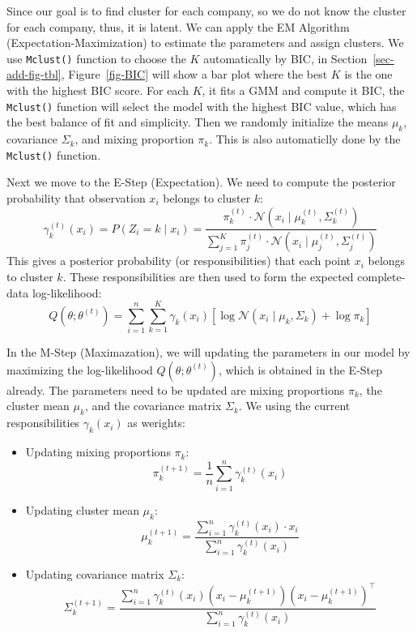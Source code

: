\documentclass[
  letterpaper,
  DIV=11,
  numbers=noendperiod]{scrartcl}
\providecommand{\tightlist}{%
  \setlength{\itemsep}{0pt}\setlength{\parskip}{0pt}}\usepackage{longtable,booktabs,array}
\begin{document}
Since our goal is to find cluster for each company, so we do not know
the cluster for each company, thus, it is latent. We can apply the EM
Algorithm (Expectation-Maximization) to estimate the parameters and
assign clusters. We use \texttt{Mclust()} function to choose the \(K\)
automatically by BIC, in Section~\ref{sec-add-fig-tbl},
Figure~\ref{fig-BIC} will show a bar plot where the best \(K\) is the
one with the highest BIC score. For each \(K\), it fits a GMM and
compute it BIC, the \texttt{Mclust()} function will select the model
with the highest BIC value, which has the best balance of fit and
simplicity. Then we randomly initialize the means \(\mu_k\), covariance
\(\Sigma_k\), and mixing proportion \(\pi_k\). This is also automaticlly
done by the \texttt{Mclust()} function.

Next we move to the E-Step (Expectation). We need to compute the
posterior probability that observation \(x_i\) belongs to cluster \(k\):
\[
\gamma_k^{(t)}(x_i) = P(Z_i = k \mid x_i) = 
\frac{ \pi_k^{(t)} \cdot \mathcal{N}(x_i \mid \mu_k^{(t)}, \Sigma_k^{(t)}) }
     { \sum_{j=1}^{K} \pi_j^{(t)} \cdot \mathcal{N}(x_i \mid \mu_j^{(t)}, \Sigma_j^{(t)}) }
\] This gives a posterior probability (or responsibilities) that each
point \(x_i\) belongs to cluster \(k\). These responsibilities are then
used to form the expected complete-data log-likelihood: \[
Q(\theta; \theta^{(t)}) = \sum_{i=1}^{n} \sum_{k=1}^{K} \gamma_k(x_i) \left[ \log \mathcal{N}(x_i \mid \mu_k, \Sigma_k) + \log \pi_k \right]
\]

In the M-Step (Maximazation), we will updating the parameters in our
model by maximizing the log-likelihood \(Q(\theta; \theta^{(t)})\),
which is obtained in the E-Step already. The parameters need to be
updated are mixing proportions \(\pi_k\), the cluster mean \(\mu_k\),
and the covariance matrix \(\Sigma_k\). We using the current
responsibilities \(\gamma_k(x_i)\) as werights:

\begin{itemize}
\tightlist
\item
  Updating mixing proportions \(\pi_k\): \[
  \pi_k^{(t+1)} = \frac{1}{n} \sum_{i=1}^{n} \gamma_k^{(t)}(x_i)
  \]
\item
  Updating cluster mean \(\mu_k\): \[
  \mu_k^{(t+1)} = \frac{\sum_{i=1}^{n} \gamma_k^{(t)}(x_i) \cdot x_i}{\sum_{i=1}^{n} \gamma_k^{(t)}(x_i)}
  \]
\item
  Updating covariance matrix \(\Sigma_k\): \[
  \Sigma_k^{(t+1)} = \frac{\sum_{i=1}^{n} \gamma_k^{(t)}(x_i) (x_i - \mu_k^{(t+1)})(x_i - \mu_k^{(t+1)})^\top}{\sum_{i=1}^{n} \gamma_k^{(t)}(x_i)}
  \]
\end{itemize}
\end{document}
